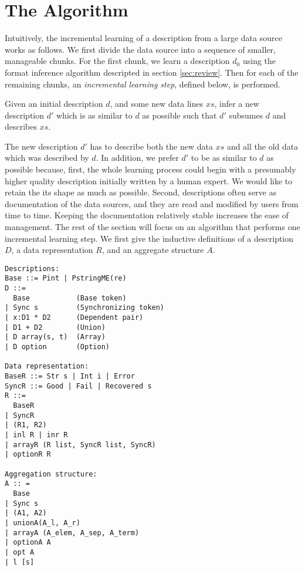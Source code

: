\section{The Algorithm}
\label{sec:algo}
Intuitively, the incremental learning of a description from a large data source works
as follows. We first divide the data source into a sequence of smaller, manageable chunks.
For the first chunk, we learn a description $d_0$ using the format inference
algorithm descripted in section \ref{sec:review}. Then for each of the remaining chunks,
an {\em incremental learning step}, defined below, is performed.  

\begin{definition}
Given an initial description $d$, and some new data lines $xs$, infer a new description $d'$ 
which is as similar to $d$ as possible such that $d'$ subsumes $d$ and describes $xs$.
\end{definition}

The new description $d'$ has to describe both the new data $xs$ and
all the old data which was described by $d$. 
In addition, we prefer $d'$ to be as similar to $d$ as possible because, 
first, the whole learning process could begin with a presumably higher quality description 
initially written by a human expert. We would like to retain the its shape as much as possible.
Second, descriptions often serve as documentation of the data sources, and they are
read and modified by users from time to time. Keeping the documentation relatively stable increases
the ease of management. The rest of the section will focus on an algorithm that
performs one incremental learning step.
We first give the inductive definitions of
a description $D$, a data representation $R$, and an aggregate structure $A$. 

{\small 
\begin{verbatim}
Descriptions:
Base ::= Pint | PstringME(re)
D ::=   
  Base           (Base token)
| Sync s         (Synchronizing token) 
| x:D1 * D2      (Dependent pair)
| D1 + D2        (Union)
| D array(s, t)  (Array)
| D option       (Option)

Data representation:
BaseR ::= Str s | Int i | Error
SyncR ::= Good | Fail | Recovered s 
R ::=
  BaseR
| SyncR
| (R1, R2)
| inl R | inr R
| arrayR (R list, SyncR list, SyncR)
| optionR R

Aggregation structure:
A :: = 
  Base
| Sync s
| (A1, A2)
| unionA(A_l, A_r)
| arrayA (A_elem, A_sep, A_term)
| optionA A
| opt A
| l [s]
\end{verbatim}
}

